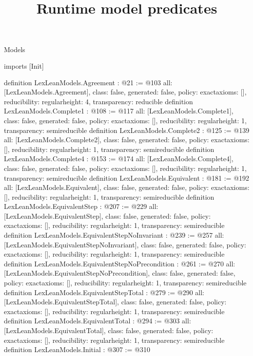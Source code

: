 \begin{lexlean}{Models}
\title{Runtime model predicates}
\begin{coremodule}
imports [Init]

definition LexLeanModels.Agreement : @21 := @103 {
  all: [LexLeanModels.Agreement],
  class: false,
  generated: false,
  policy: exact{axioms: []},
  reducibility: regular{height: 4},
  transparency: reducible
}
definition LexLeanModels.Complete1 : @108 := @117 {
  all: [LexLeanModels.Complete1],
  class: false,
  generated: false,
  policy: exact{axioms: []},
  reducibility: regular{height: 1},
  transparency: semireducible
}
definition LexLeanModels.Complete2 : @125 := @139 {
  all: [LexLeanModels.Complete2],
  class: false,
  generated: false,
  policy: exact{axioms: []},
  reducibility: regular{height: 1},
  transparency: semireducible
}
definition LexLeanModels.Complete4 : @153 := @174 {
  all: [LexLeanModels.Complete4],
  class: false,
  generated: false,
  policy: exact{axioms: []},
  reducibility: regular{height: 1},
  transparency: semireducible
}
definition LexLeanModels.Equivalent : @181 := @192 {
  all: [LexLeanModels.Equivalent],
  class: false,
  generated: false,
  policy: exact{axioms: []},
  reducibility: regular{height: 1},
  transparency: semireducible
}
definition LexLeanModels.EquivalentStep : @207 := @229 {
  all: [LexLeanModels.EquivalentStep],
  class: false,
  generated: false,
  policy: exact{axioms: []},
  reducibility: regular{height: 1},
  transparency: semireducible
}
definition LexLeanModels.EquivalentStepNoInvariant : @239 := @257 {
  all: [LexLeanModels.EquivalentStepNoInvariant],
  class: false,
  generated: false,
  policy: exact{axioms: []},
  reducibility: regular{height: 1},
  transparency: semireducible
}
definition LexLeanModels.EquivalentStepNoPrecondition : @261 := @270 {
  all: [LexLeanModels.EquivalentStepNoPrecondition],
  class: false,
  generated: false,
  policy: exact{axioms: []},
  reducibility: regular{height: 1},
  transparency: semireducible
}
definition LexLeanModels.EquivalentStepTotal : @279 := @290 {
  all: [LexLeanModels.EquivalentStepTotal],
  class: false,
  generated: false,
  policy: exact{axioms: []},
  reducibility: regular{height: 1},
  transparency: semireducible
}
definition LexLeanModels.EquivalentTotal : @294 := @303 {
  all: [LexLeanModels.EquivalentTotal],
  class: false,
  generated: false,
  policy: exact{axioms: []},
  reducibility: regular{height: 1},
  transparency: semireducible
}
definition LexLeanModels.Initial : @307 := @310 {
}
\end{coremodule}
\end{lexlean}
